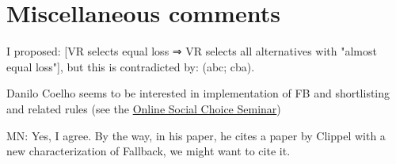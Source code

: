 \documentclass[version=3.21, pagesize, twoside=off, bibliography=totoc, DIV=calc, fontsize=12pt, a4paper]{scrartcl}
\begin{document}
\section{Miscellaneous comments}
I proposed: [VR selects equal loss ⇒ VR selects all alternatives with "almost equal loss"], but this is contradicted by: (abc; cba).


Danilo Coelho seems to be interested in implementation of FB and shortlisting and related rules (see the \href{https://www.cmss.auckland.ac.nz/2020/06/03/online-social-choice-seminar-series/}{Online Social Choice Seminar})

\color{green}MN: Yes, I agree. By the way, in his paper, he cites a paper by Clippel with a new characterization of Fallback, we might want to cite it.\color{black}

%
\end{document}
